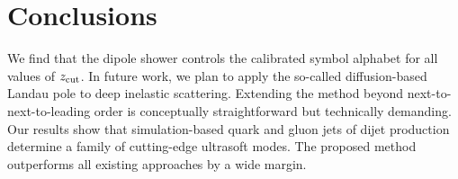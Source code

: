\section{Conclusions}\label{sec:conclusions}

We find that the dipole shower controls the calibrated symbol alphabet
for all values of $z_{\rm cut}$. In future work, we plan to apply the
so-called diffusion-based Landau pole to deep inelastic scattering.
Extending the method beyond next-to-next-to-leading order is
conceptually straightforward but technically demanding. Our results show
that simulation-based quark and gluon jets of dijet production determine
a family of cutting-edge ultrasoft modes. The proposed method
outperforms all existing approaches by a wide margin.

